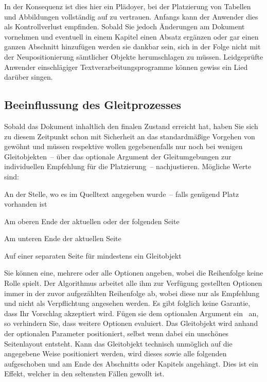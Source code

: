 \documentclass[%
  english,ngerman,%
  cdgeometry=no,DIV=12,automark,%
]{tudscrartcl}
\begin{document}
\InputCode\noindent
%
In der Konsequenz ist dies hier ein Plädoyer, bei der Platzierung von Tabellen 
und Abbildungen vollständig auf  zu vertrauen. Anfangs kann der 
Anwender dies als Kontrollverlust empfinden. Sobald Sie jedoch Änderungen am 
Dokument vornehmen und eventuell in einem Kapitel einen Absatz ergänzen oder 
gar einen ganzen Abschnitt hinzufügen werden sie dankbar sein, sich in der 
Folge nicht mit der Neupositionierung sämtlicher Objekte herumschlagen zu 
müssen. Leidgeprüfte Anwender einschlägiger Textverarbeitungsprogramme können 
gewiss ein Lied darüber singen.



\subsection{Beeinflussung des Gleitprozesses}
Sobald das Dokument inhaltlich den finalen Zustand erreicht hat, haben Sie sich 
zu diesem Zeitpunkt schon mit Sicherheit an das standardmäßige Vorgehen von 
 gewöhnt und müssen respektive wollen gegebenenfalls nur noch bei 
wenigen Gleitobjekten~-- über das optionale Argument der Gleitumgebungen zur
individuellen Empfehlung für die Platzierung~-- nachjustieren. Mögliche Werte 
sind:
%
\begin{description}[labelindent=\parindent,leftmargin=*,style=nextline]
\item[\POParameter{h} (here)]
  An der Stelle, wo es im Quelltext angegeben wurde~-- falls genügend Platz 
  vorhanden ist
\item[\POParameter{t} (top)]
  Am oberen Ende der aktuellen oder der folgenden Seite
\item[\POParameter{b} (bottom)]
  Am unteren Ende der aktuellen Seite
\item[\POParameter{p} (page)]
  Auf einer separaten Seite für mindestens ein Gleitobjekt
\end{description}
%
Sie können eine, mehrere oder alle Optionen angeben, wobei die Reihenfolge 
keine Rolle spielt. Der Algorithmus arbeitet alle ihm zur Verfügung gestellten 
Optionen immer in der zuvor aufgezählten Reihenfolge ab, wobei diese nur als 
Empfehlung und nicht als Verpflichtung angesehen werden. Es gibt folglich keine 
Garantie, dass Ihr Vorschlag akzeptiert wird. Fügen sie dem optionalen Argument 
ein~\PValue{!} an, so verhindern Sie, dass  weitere Optionen 
evaluiert. Das Gleitobjekt wird anhand der optionalen Parameter positioniert, 
selbst wenn dabei ein unschönes Seitenlayout entsteht. Kann das Gleitobjekt 
technisch unmöglich auf die angegebene Weise positioniert werden, wird dieses 
sowie alle folgenden aufgeschoben und am Ende des Abschnitts oder Kapitels 
angehängt. Dies ist ein Effekt, welcher in den seltensten Fällen gewollt ist. 
\end{document}
